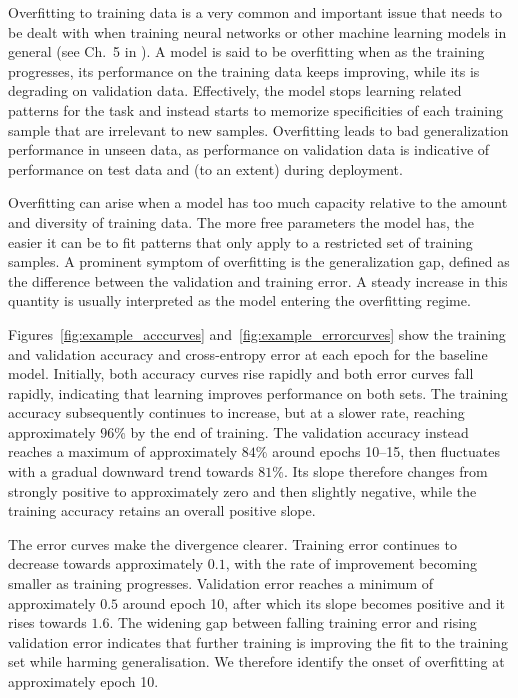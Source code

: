 \documentclass{article}
\begin{document}
Overfitting to training data is a very common and important issue that needs to be dealt with when training neural networks or other machine learning models in general (see Ch.~5 in \citealt{Goodfellow-et-al-2016}).
A model is said to be overfitting when as the training progresses, its performance on the training data keeps improving, while its is degrading on validation data. 
Effectively, the model stops learning related patterns for the task and instead starts to memorize specificities of each training sample that are irrelevant to new samples. 
Overfitting leads to bad generalization performance in unseen data, as performance on validation data is indicative of performance on test data and (to an extent) during deployment.

Overfitting can arise when a model has too much capacity relative to the amount and diversity of training data. The more free parameters the model has, the easier it can be to fit patterns that only apply to a restricted set of training samples.
A prominent symptom of overfitting is the generalization gap, defined as the difference between the validation and training error. 
A steady increase in this quantity is usually interpreted as the model entering the overfitting regime.


Figures~\ref{fig:example_acccurves} and~\ref{fig:example_errorcurves} show the training and validation accuracy and cross-entropy error at each epoch for the baseline model.
Initially, both accuracy curves rise rapidly and both error curves fall rapidly, indicating that learning improves performance on both sets.
The training accuracy subsequently continues to increase, but at a slower rate, reaching approximately $96\%$ by the end of training.
The validation accuracy instead reaches a maximum of approximately $84\%$ around epochs 10--15, then fluctuates with a gradual downward trend towards $81\%$.
Its slope therefore changes from strongly positive to approximately zero and then slightly negative, while the training accuracy retains an overall positive slope.

The error curves make the divergence clearer.
Training error continues to decrease towards approximately $0.1$, with the rate of improvement becoming smaller as training progresses.
Validation error reaches a minimum of approximately $0.5$ around epoch 10, after which its slope becomes positive and it rises towards $1.6$.
The widening gap between falling training error and rising validation error indicates that further training is improving the fit to the training set while harming generalisation.
We therefore identify the onset of overfitting at approximately epoch 10.
\end{document}
